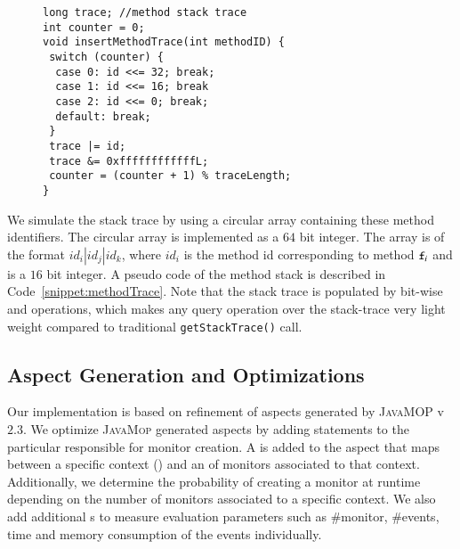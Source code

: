  \begin{figure}[t]
\begin{lstlisting}
long trace; //method stack trace
int counter = 0;
void insertMethodTrace(int methodID) {
 switch (counter) {
  case 0: id <<= 32; break;
  case 1: id <<= 16; break
  case 2: id <<= 0; break;
  default: break;
 }
 trace |= id;
 trace &= 0xffffffffffffL;
 counter = (counter + 1) % traceLength;
}
\end{lstlisting}
\end{figure}

We simulate the stack trace by using a circular array containing these method 
identifiers. The circular array is implemented as a $64$ bit  
integer. The array is of the format $id_i|id_j|id_k$, where $id_i$ is the 
method id corresponding to method $\code{f}_i$ and is a $16$ bit integer. A 
pseudo code of the method stack is described in Code~\ref{snippet:methodTrace}. 
Note that the stack trace is populated by bit-wise \code{<<} and \code{|} 
operations, which makes any query operation over the stack-trace very light 
weight compared to traditional \texttt{getStackTrace()} call.

\subsection{Aspect Generation and Optimizations}
\label{subsec:aspectGen}

Our implementation is based on refinement of aspects generated by 
\textsc{JavaMOP} v$2.3$. 
% 
% 
We optimize \textsc{JavaMop} generated aspects by adding statements to the 
particular  responsible for monitor creation. A  
 is added to the aspect that maps between a specific context () and 
an  of monitors associated to that context. Additionally, we 
 determine the probability of creating a monitor at runtime depending on the 
number of monitors associated to a specific context. We also add additional s to measure 
evaluation parameters such as \#monitor, \#events, time and memory consumption 
of the events individually.

